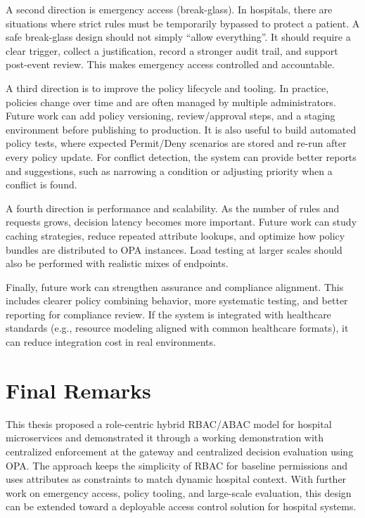 A second direction is emergency access (break-glass). In hospitals, there are situations where strict rules must be
temporarily bypassed to protect a patient. A safe break-glass design should not simply ``allow everything''. It should
require a clear trigger, collect a justification, record a stronger audit trail, and support post-event review. This makes
emergency access controlled and accountable.
\vspace{0.5cm}


A third direction is to improve the policy lifecycle and tooling. In practice, policies change over time and are often
managed by multiple administrators. Future work can add policy versioning, review/approval steps, and a staging environment
before publishing to production. It is also useful to build automated policy tests, where expected Permit/Deny scenarios are
stored and re-run after every policy update. For conflict detection, the system can provide better reports and suggestions,
such as narrowing a condition or adjusting priority when a conflict is found.
\vspace{0.5cm}


A fourth direction is performance and scalability. As the number of rules and requests grows, decision latency becomes more
important. Future work can study caching strategies, reduce repeated attribute lookups, and optimize how policy bundles are
distributed to OPA instances. Load testing at larger scales should also be performed with realistic mixes of endpoints.
\vspace{0.5cm}


Finally, future work can strengthen assurance and compliance alignment. This includes clearer policy combining behavior,
more systematic testing, and better reporting for compliance review. If the system is integrated with healthcare standards
(e.g., resource modeling aligned with common healthcare formats), it can reduce integration cost in real environments.

\section{Final Remarks}
\label{sec:final_remarks}
This thesis proposed a role-centric hybrid RBAC/ABAC model for hospital microservices and demonstrated it through a working
demonstration with centralized enforcement at the gateway and centralized decision evaluation using OPA. The approach keeps the
simplicity of RBAC for baseline permissions and uses attributes as constraints to match dynamic hospital context. With further
work on emergency access, policy tooling, and large-scale evaluation, this design can be extended toward a deployable access
control solution for hospital systems.